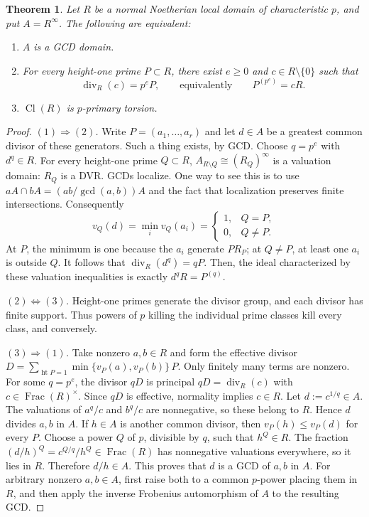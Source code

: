 \documentclass[11pt,a4paper]{amsart}
\numberwithin{equation}{section}
\newtheorem{theorem}{Theorem}[section]
\newcommand{\Cl}{\operatorname{Cl}}
\newcommand{\divisor}{\operatorname{div}}
\newcommand{\Frac}{\operatorname{Frac}}
\begin{document}
 \begin{theorem}\label{thm:gcd}
 Let $R$ be a normal Noetherian local domain of characteristic $p$,
 	and put $A=R^\infty$. The following are equivalent:
 \begin{enumerate}
\item $A$ is a GCD domain.
 	\item For every height-one prime $P\subset R$, there exist $e\geq0$
and $c\in R\setminus\{0\}$ such that
$$\divisor_R(c)=p^eP,
\qquad\text{equivalently}\qquad P^{(p^e)}=cR.
 $$
\item $\Cl(R)$ is $p$-primary torsion.
\end{enumerate}
 \end{theorem}
 
 \begin{proof}	\emph{$(1)\Rightarrow(2)$.}
Write $P=(a_1,\ldots,a_r)$ and let $d\in A$ be a greatest
common divisor of these generators. Such a thing exists, by GCD.
	Choose $q=p^e$ with $d^q\in R$.	For every height-one prime $Q\subset R$,
$A_{R\setminus Q}\cong(R_Q)^\infty	$
is a valuation domain: $R_Q$ is a DVR.
GCDs localize. One way to see this is to use
 $aA\cap bA=(ab/\gcd(a,b))A	$	and the fact that localization preserves finite intersections.
Consequently
$$
 	v_Q(d)=\min_i v_Q(a_i)=
 	\begin{cases}
 		1,&Q=P,\\
 		0,&Q\neq P.
 	\end{cases}
$$At $P$, the minimum is one because the $a_i$ generate $PR_P$;
at $Q\neq P$, at least one $a_i$ is outside $Q$.
It follows that
$\divisor_R(d^q)=qP$.
Then, the ideal characterized by these valuation inequalities
is exactly $d^qR=P^{(q)}$.
 	
\medskip\noindent
\emph{$(2)\Longleftrightarrow(3)$.}
 Height-one primes generate the divisor group, and each divisor
 	has finite support. Thus powers of $p$ killing the individual
 	prime classes kill every class, and conversely.
 	
 	\medskip\noindent
 	\emph{$(3)\Rightarrow(1)$.}
 	Take nonzero $a,b\in R$ and form the effective divisor
 $	D=\sum_{\operatorname{ht}P=1}\min\{v_P(a),v_P(b)\}\,P.$	Only finitely many terms are nonzero.
For some $q=p^e$, the divisor $qD$ is principal 
$qD=\divisor_R(c)$ with	$ c\in\Frac(R)^\times.$
Since $qD$ is effective, normality implies $c\in R$.
 Let $d:=c^{1/q}\in A$.
The valuations of $a^q/c$ and $b^q/c$ are nonnegative, so these
belong to $R$.
Hence $d$ divides $a,b$ in $A$.
If $h\in A$ is another common divisor, then
$v_P(h)\leq v_P(d)$ for every $P$.
Choose a power $Q$ of $p$, divisible by $q$, such that
$h^Q\in R$. The fraction
$(d/h)^Q=c^{Q/q}/h^Q\in\Frac(R)$	has nonnegative valuations everywhere, so it lies in $R$.
Therefore $d/h\in A$.
This proves that $d$ is a GCD of $a,b$ in $A$.
 	For arbitrary nonzero $a,b\in A$, first raise both to a common
 	$p$-power placing them in $R$, and then apply the inverse
 	Frobenius automorphism of $A$ to the resulting GCD.
 \end{proof}
 
\end{document}
